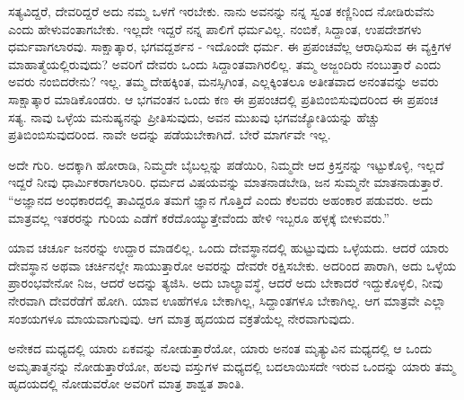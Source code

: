 ಸತ್ಯವಿದ್ದರೆ, ದೇವರಿದ್ದರೆ ಅದು ನಮ್ಮ ಒಳಗೆ ಇರಬೇಕು. ನಾನು ಅವನನ್ನು ನನ್ನ ಸ್ವಂತ ಕಣ್ಣಿನಿಂದ ನೋಡಿರುವೆನು ಎಂದು ಹೇಳುವಂತಾಗಬೇಕು. ಇಲ್ಲದೇ ಇದ್ದರೆ ನನ್ನ ಪಾಲಿಗೆ ಧರ್ಮವಿಲ್ಲ. ನಂಬಿಕೆ, ಸಿದ್ದಾಂತ, ಉಪದೇಶಗಳು ಧರ್ಮವಾಗಲಾರವು. ಸಾಕ್ಷಾತ್ಕಾರ, ಭಗವದ್ದರ್ಶನ - ಇದೊಂದೇ ಧರ್ಮ. ಈ ಪ್ರಪಂಚವೆಲ್ಲ ಆರಾಧಿಸುವ ಈ ವ್ಯಕ್ತಿಗಳ ಮಾಹಾತ್ಮೆಯಲ್ಲಿರುವುದು? ಅವರಿಗೆ ದೇವರು ಒಂದು ಸಿದ್ದಾಂತವಾಗಿರಲಿಲ್ಲ. ತಮ್ಮ ಅಜ್ಜಂದಿರು ನಂಬುತ್ತಾರೆ ಎಂದು ಅವರು ನಂಬಿದರೇನು? ಇಲ್ಲ. ತಮ್ಮ ದೇಹಕ್ಕಿಂತ, ಮನಸ್ಸಿಗಿಂತ, ಎಲ್ಲಕ್ಕಿಂತಲೂ ಅತೀತವಾದ ಅನಂತವನ್ನು ಅವರು ಸಾಕ್ಷಾತ್ಕಾರ ಮಾಡಿಕೊಂಡರು. ಆ ಭಗವಂತನ ಒಂದು ಕಣ ಈ ಪ್ರಪಂಚದಲ್ಲಿ ಪ್ರತಿಬಿಂಬಿಸುವುದರಿಂದ ಈ ಪ್ರಪಂಚ ಸತ್ಯ. ನಾವು ಒಳ್ಳೆಯ ಮನುಷ್ಯನನ್ನು ಪ್ರೀತಿಸುವುದು, ಅವನ ಮುಖವು ಭಗವಜ್ಯೋತಿಯನ್ನು ಹೆಚ್ಚು ಪ್ರತಿಬಿಂಬಿಸುವುದರಿಂದ. ನಾವೇ ಅದನ್ನು ಪಡೆಯಬೇಕಾಗಿದೆ. ಬೇರೆ ಮಾರ್ಗವೇ ಇಲ್ಲ.

ಅದೇ ಗುರಿ. ಅದಕ್ಕಾಗಿ ಹೋರಾಡಿ, ನಿಮ್ಮದೇ ಬೈಬಲ್ಲನ್ನು ಪಡೆಯಿರಿ, ನಿಮ್ಮದೇ ಆದ ಕ್ರಿಸ್ತನನ್ನು ಇಟ್ಟುಕೊಳ್ಳಿ, ಇಲ್ಲದೆ ಇದ್ದರೆ ನೀವು ಧಾರ್ಮಿಕರಾಗಲಾರಿರಿ. ಧರ್ಮದ ವಿಷಯವನ್ನು ಮಾತನಾಡಬೇಡಿ, ಜನ ಸುಮ್ಮನೇ ಮಾತನಾಡುತ್ತಾರೆ. “ಅಜ್ಞಾನದ ಅಂಧಕಾರದಲ್ಲಿ ತಾವಿದ್ದರೂ ತಮಗೆ ಜ್ಞಾನ ಗೊತ್ತಿದೆ ಎಂದು ಕೆಲವರು ಅಹಂಕಾರ ಪಡುವರು. ಅದು ಮಾತ್ರವಲ್ಲ ಇತರರನ್ನು ಗುರಿಯ ಎಡೆಗೆ ಕರೆದೊಯ್ಯುತ್ತೇವೆಂದು ಹೇಳಿ ಇಬ್ಬರೂ ಹಳ್ಳಕ್ಕೆ ಬೀಳುವರು.”

ಯಾವ ಚರ್ಚೂ ಜನರನ್ನು ಉದ್ದಾರ ಮಾಡಲಿಲ್ಲ. ಒಂದು ದೇವಸ್ಥಾನದಲ್ಲಿ ಹುಟ್ಟುವುದು ಒಳ್ಳೆಯದು. ಆದರೆ ಯಾರು ದೇವಸ್ಥಾನ ಅಥವಾ ಚರ್ಚಿನಲ್ಲೇ ಸಾಯುತ್ತಾರೋ ಅವರನ್ನು ದೇವರೇ ರಕ್ಷಿಸಬೇಕು. ಅದರಿಂದ ಪಾರಾಗಿ, ಅದು ಒಳ್ಳೆಯ ಪ್ರಾರಂಭವೇನೋ ನಿಜ, ಆದರೆ ಅದನ್ನು ತ್ಯಜಿಸಿ. ಅದು ಬಾಲ್ಯಾವಸ್ಥೆ, ಆದರೆ ಅದು ಬೇಕಾದರೆ ಇದ್ದುಕೊಳ್ಳಲಿ, ನೀವು ನೇರವಾಗಿ ದೇವರೆಡೆಗೆ ಹೋಗಿ. ಯಾವ ಊಹೆಗಳೂ ಬೇಕಾಗಿಲ್ಲ, ಸಿದ್ದಾಂತಗಳೂ ಬೇಕಾಗಿಲ್ಲ. ಆಗ ಮಾತ್ರವೇ ಎಲ್ಲಾ ಸಂಶಯಗಳೂ ಮಾಯವಾಗುವುವು. ಆಗ ಮಾತ್ರ ಹೃದಯದ ವಕ್ರತೆಯೆಲ್ಲ ನೇರವಾಗುವುದು.

\newpage

ಅನೇಕದ ಮಧ್ಯದಲ್ಲಿ ಯಾರು ಏಕವನ್ನು ನೋಡುತ್ತಾರೆಯೋ, ಯಾರು ಅನಂತ ಮೃತ್ಯುವಿನ ಮಧ್ಯದಲ್ಲಿ ಆ ಒಂದು ಅಮೃತಾತ್ಮನನ್ನು ನೋಡುತ್ತಾರೆಯೋ, ಹಲವು ವಸ್ತುಗಳ ಮಧ್ಯದಲ್ಲಿ ಬದಲಾಯಿಸದೇ ಇರುವ ಒಂದನ್ನು ಯಾರು ತಮ್ಮ ಹೃದಯದಲ್ಲಿ ನೋಡುವರೋ ಅವರಿಗೆ ಮಾತ್ರ ಶಾಶ್ವತ ಶಾಂತಿ.


